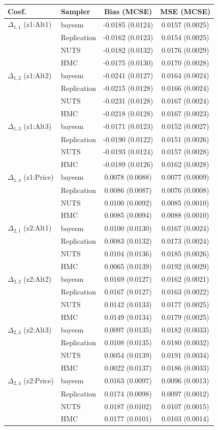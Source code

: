 \begin{tabular}{llcc}
\toprule
Coef. & Sampler & Bias (MCSE) & MSE (MCSE) \\
\midrule
$\Delta_{1,1}$ (z1:Alt1) & bayesm & -0.0185 (0.0124) & 0.0157 (0.0025) \\
 & Replication & -0.0162 (0.0123) & 0.0154 (0.0025) \\
 & NUTS & -0.0182 (0.0132) & 0.0176 (0.0029) \\
 & HMC & -0.0175 (0.0130) & 0.0170 (0.0028) \\
$\Delta_{1,2}$ (z1:Alt2) & bayesm & -0.0241 (0.0127) & 0.0164 (0.0024) \\
 & Replication & -0.0215 (0.0128) & 0.0166 (0.0024) \\
 & NUTS & -0.0231 (0.0128) & 0.0167 (0.0024) \\
 & HMC & -0.0218 (0.0128) & 0.0167 (0.0023) \\
$\Delta_{1,3}$ (z1:Alt3) & bayesm & -0.0171 (0.0123) & 0.0152 (0.0027) \\
 & Replication & -0.0190 (0.0122) & 0.0151 (0.0026) \\
 & NUTS & -0.0193 (0.0124) & 0.0157 (0.0028) \\
 & HMC & -0.0189 (0.0126) & 0.0162 (0.0028) \\
$\Delta_{1,4}$ (z1:Price) & bayesm & 0.0078 (0.0088) & 0.0077 (0.0009) \\
 & Replication & 0.0086 (0.0087) & 0.0076 (0.0008) \\
 & NUTS & 0.0100 (0.0092) & 0.0085 (0.0010) \\
 & HMC & 0.0085 (0.0094) & 0.0088 (0.0010) \\
$\Delta_{2,1}$ (z2:Alt1) & bayesm & 0.0100 (0.0130) & 0.0167 (0.0024) \\
 & Replication & 0.0083 (0.0132) & 0.0173 (0.0024) \\
 & NUTS & 0.0104 (0.0136) & 0.0185 (0.0026) \\
 & HMC & 0.0065 (0.0139) & 0.0192 (0.0029) \\
$\Delta_{2,2}$ (z2:Alt2) & bayesm & 0.0169 (0.0127) & 0.0162 (0.0021) \\
 & Replication & 0.0167 (0.0127) & 0.0163 (0.0022) \\
 & NUTS & 0.0142 (0.0133) & 0.0177 (0.0025) \\
 & HMC & 0.0149 (0.0134) & 0.0179 (0.0025) \\
$\Delta_{2,3}$ (z2:Alt3) & bayesm & 0.0097 (0.0135) & 0.0182 (0.0033) \\
 & Replication & 0.0108 (0.0135) & 0.0180 (0.0032) \\
 & NUTS & 0.0054 (0.0139) & 0.0191 (0.0034) \\
 & HMC & 0.0022 (0.0137) & 0.0186 (0.0033) \\
$\Delta_{2,4}$ (z2:Price) & bayesm & 0.0163 (0.0097) & 0.0096 (0.0013) \\
 & Replication & 0.0174 (0.0098) & 0.0097 (0.0012) \\
 & NUTS & 0.0187 (0.0102) & 0.0107 (0.0015) \\
 & HMC & 0.0177 (0.0101) & 0.0103 (0.0014) \\
\bottomrule
\end{tabular}
